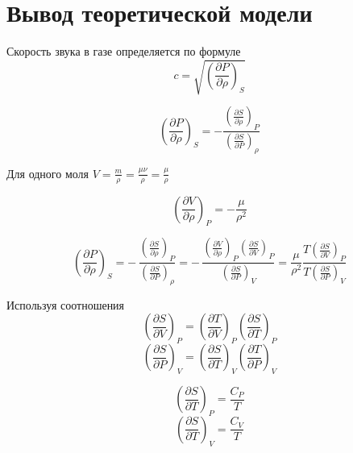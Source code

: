 \documentclass[a4paper,12pt]{article}
\begin{document}
\section{Вывод теоретической модели}
Скорость звука в газе определяется по формуле
\begin{equation}
	c = \sqrt{\left ( \frac{\partial P}{\partial \rho}\right )_S}
\end{equation}

\begin{equation}
	\left ( \frac{\partial P}{\partial \rho}\right )_S = - \frac{\left ( \frac{\partial S}{\partial \rho}\right )_P}{\left ( \frac{\partial S}{\partial P}\right )_\rho} 
\end{equation}

Для одного моля $V = \frac{m}{\rho} = \frac{\mu \nu}{\rho} = \frac{\mu}{\rho}$

\begin{equation}
	\left ( \frac{\partial V}{\partial \rho}\right )_P = - \frac{\mu}{\rho^2}
\end{equation}


\begin{equation}
	\left ( \frac{\partial P}{\partial \rho}\right )_S = - \,  \frac{\left ( \frac{\partial S}{\partial \rho}\right )_P}{\left ( \frac{\partial S}{\partial P}\right )_\rho} = - \, \frac{\left ( \frac{\partial V}{\partial \rho}\right )_P \left ( \frac{\partial S}{\partial V}\right )_P}{\left ( \frac{\partial S}{\partial P}\right )_V} = \frac{\mu}{\rho^2} \frac{T \left ( \frac{\partial S}{\partial V}\right )_P}{T \left ( \frac{\partial S}{\partial P}\right )_V}
\end{equation}

Используя соотношения
\begin{equation}
	\left ( \frac{\partial S}{\partial V}\right )_P =  \left ( \frac{\partial T}{\partial V}\right )_P \left ( \frac{\partial S}{\partial T}\right )_P
\end{equation}
\begin{equation}
	\left ( \frac{\partial S}{\partial P}\right )_V = \left ( \frac{\partial S}{\partial T}\right )_V \left ( \frac{\partial T}{\partial P}\right )_V
\end{equation}

\begin{equation}
	\left ( \frac{\partial S}{\partial T}\right )_P = \frac{C_P}{T}
\end{equation}
\begin{equation}
	\left ( \frac{\partial S}{\partial T}\right )_V = \frac{C_V}{T}
\end{equation}
\end{document}
